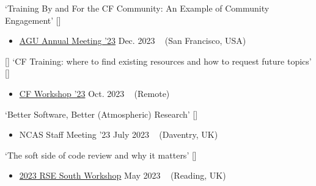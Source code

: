 \begin{talks}
    \talk
	{\faCommentingO \hspace{1mm} `Training By and For the CF Community: An Example of Community Engagement' [\href{https://figshare.com/articles/presentation/Training_By_and_For_the_CF_Community_An_Example_of_Community_Engagement/24814140?file=43646967}{\small{\linkSymbol}}]}
	{
	\begin{itemize}[leftmargin=.4in]
	    \item \href{https://agu.confex.com/agu/fm23/meetingapp.cgi/Home/0}{AGU Annual Meeting '23}
	    \hfill Dec. 2023 ~ (San Francisco, USA)
	\end{itemize}
	}

    \talk
	{\faCommentingO \hspace{1mm} [\faEnvelopeO] \hspace{1mm} `CF Training: where to find existing resources and how to request future topics' [\href{https://github.com/sadielbartholomew/sadielbartholomew/blob/master/talks-and-workshops/CF_training_lightning_talk_SLB.pdf}{\small{\linkSymbol}}]}
	{
	\begin{itemize}[leftmargin=.4in]
	    \item \href{https://cfconventions.org/Meetings/2023-Workshop.html}{CF Workshop '23}
	    \hfill Oct. 2023 ~ (Remote)
	\end{itemize}
	}

    \talk
	{\faCommentingO \hspace{1mm} `Better Software, Better (Atmospheric) Research' [\href{https://github.com/sadielbartholomew/sadielbartholomew/blob/master/talks-and-workshops/ncas-agm-23-better-atmos-software.pdf}{\small{\linkSymbol}}]}
	{
	\begin{itemize}[leftmargin=.4in]
	    \item NCAS Staff Meeting '23
	    \hfill July 2023 ~ (Daventry, UK)
	\end{itemize}
	}

    \talk
	{\faCommentingO \hspace{1mm} `The soft side of code review and why it matters' [\href{https://github.com/sadielbartholomew/sadielbartholomew/blob/master/talks-and-workshops/rse-south-soft-side-code-review.pdf}{\small{\linkSymbol}}]}
	{
	\begin{itemize}[leftmargin=.4in]
	    \item \href{https://rsesouth.github.io/workshop/}{2023 RSE South Workshop}
	    \hfill May 2023 ~ (Reading, UK)
	\end{itemize}
	}


\end{talks}
